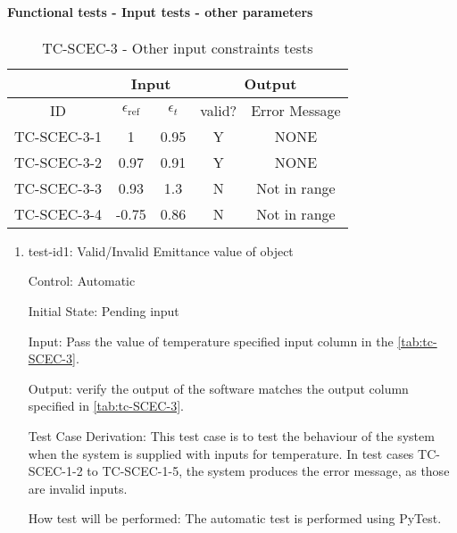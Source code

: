 \documentclass[12pt, titlepage]{article}
\begin{document}
\paragraph{Functional tests - Input tests - other parameters}


\begin{table}[h!]
\begin{center}
\begin{tabular}{ lcccc }
\hline
\multicolumn{1}{l|}{}   & \multicolumn{2}{c|}{Input}                            & \multicolumn{2}{c}{Output} \\ 

\hline

\multicolumn{1}{c|}{ID}  &   $\epsilon_\text{ref}$  &   \multicolumn{1}{c|}{$\epsilon_t$}   &   {valid?}   &   Error Message    \\ \hline

TC-SCEC-3-1   &   1      & 0.95   & Y   & NONE          \\
TC-SCEC-3-2   &   0.97   & 0.91   & Y   & NONE          \\
TC-SCEC-3-3   &   0.93   & 1.3    & N   & Not in range  \\
TC-SCEC-3-4   &   -0.75  & 0.86   & N   & Not in range  \\ 

\hline


\end{tabular}
\caption{TC-SCEC-3 - Other input constraints tests}
\label{tab:tc-SCEC-3}
\end{center}
\end{table}

\begin{enumerate}   



\item{test-id1: Valid/Invalid Emittance value of object  \\}

Control: Automatic
					
Initial State: Pending input 
					
Input: Pass the value of temperature specified input column in the \autoref{tab:tc-SCEC-3}.
					
Output: verify the output of the software matches the output column specified in \autoref{tab:tc-SCEC-3}. 

Test Case Derivation: This test case is to test the behaviour of the system when the system is supplied with inputs for temperature. In test cases TC-SCEC-1-2 to TC-SCEC-1-5, the system produces the error message, as those are invalid inputs. 
					
How test will be performed: The automatic test is performed using PyTest.  

\end{enumerate}
\end{document}

